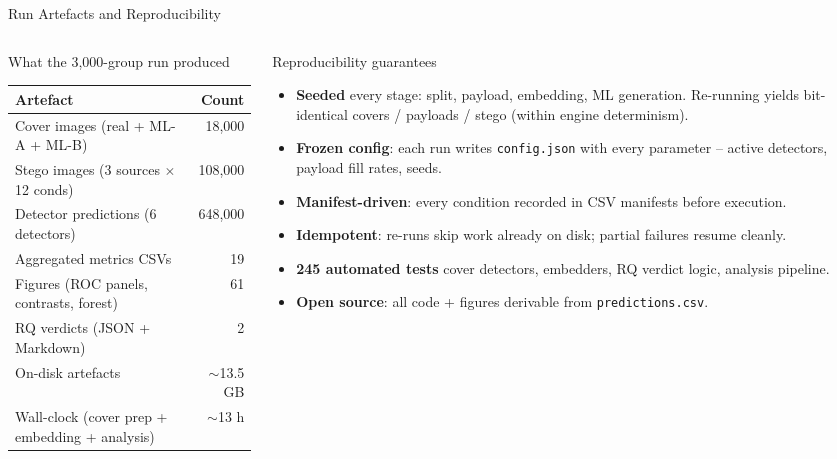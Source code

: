 \documentclass[aspectratio=169,11pt]{beamer}
\begin{document}
\begin{frame}{Run Artefacts and Reproducibility}
\scriptsize
\begin{columns}[T]
\begin{column}{0.49\textwidth}
\begin{block}{What the 3{,}000-group run produced}
\centering\renewcommand{\arraystretch}{1.05}
\begin{tabular}{l@{\hskip 6pt}r}
\textbf{Artefact} & \textbf{Count} \\
\midrule
Cover images (real + ML-A + ML-B) & 18{,}000 \\
Stego images (3 sources $\times$ 12 conds) & 108{,}000 \\
Detector predictions (6 detectors) & 648{,}000 \\
Aggregated metrics CSVs & 19 \\
Figures (ROC panels, contrasts, forest) & 61 \\
RQ verdicts (JSON + Markdown) & 2 \\
\midrule
On-disk artefacts & $\sim$13.5 GB \\
Wall-clock (cover prep + embedding + analysis) & $\sim$13 h \\
\end{tabular}
\end{block}
\end{column}
\begin{column}{0.49\textwidth}
\begin{block}{Reproducibility guarantees}
\begin{itemize}\setlength{\itemsep}{1pt}
\item \textbf{Seeded} every stage: split, payload, embedding, ML generation. Re-running yields bit-identical covers / payloads / stego (within engine determinism).
\item \textbf{Frozen config}: each run writes \texttt{config.json} with every parameter -- active detectors, payload fill rates, seeds.
\item \textbf{Manifest-driven}: every condition recorded in CSV manifests before execution.
\item \textbf{Idempotent}: re-runs skip work already on disk; partial failures resume cleanly.
\item \textbf{245 automated tests} cover detectors, embedders, RQ verdict logic, analysis pipeline.
\item \textbf{Open source}: all code + figures derivable from \texttt{predictions.csv}.
\end{itemize}
\end{block}
\end{column}
\end{columns}
\end{frame}
\end{document}
